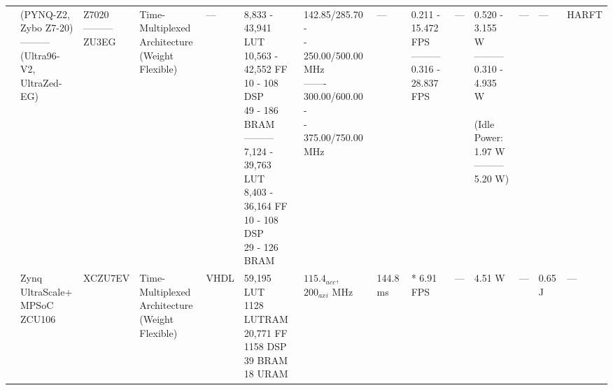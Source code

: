 \begin{center}
{\begin{tabular}{llllllllllllll}
\cite{sabogalReconfigurableFrameworkResilient2021} & \makecell[tl]{(PYNQ-Z2,\\ Zybo Z7-20)\\ ---------\\ (Ultra96-V2,\\ UltraZed-EG)} & \makecell[tl]{Z7020\\ ---------\\ ZU3EG} & \makecell[tl]{Time-Multiplexed\\ Architecture\\ (Weight Flexible)} & --- & \makecell[tl]{8,833 - 43,941 LUT\\ 10,563 - 42,552 FF\\ 10 - 108 DSP\\ 49 - 186 BRAM\\ ---------\\ 7,124 - 39,763 LUT\\ 8,403 - 36,164 FF\\ 10 - 108 DSP\\ 29 - 126 BRAM} & \makecell[tl]{142.85/285.70 -\\- 250.00/500.00\\ MHz\\ ------- \\ 300.00/600.00 -\\- 375.00/750.00\\ MHz} & --- & \makecell[tl]{0.211 - 15.472\\ FPS\\ ---------\\ 0.316 - 28.837\\ FPS} & --- & \makecell[tl]{0.520 - 3.155 W\\ ---------\\ 0.310 - 4.935 W\\ \\ (Idle Power:\\ 1.97 W\\ ---------\\ 5.20 W)} & --- & --- & \makecell[tl]{HARFT\\\cite{wilsonHybridAdaptiveReconfigurable2017}} \\
\cite{paciniMultiCacheSystemOnChip2021} & \makecell[tl]{Zynq\\ UltraScale+\\ MPSoC\\ ZCU106} & XCZU7EV & \makecell[tl]{Time-Multiplexed\\ Architecture\\ (Weight Flexible)} & VHDL & \makecell[tl]{59,195 LUT\\ 1128 LUTRAM\\ 20,771 FF\\ 1158 DSP\\ 39 BRAM\\ 18 URAM} & \makecell[tl]{$115.4_{acc}$,\\ $200_{axi}$\\ MHz} & 144.8 ms & * 6.91 FPS & --- & 4.51 W & --- & 0.65 J & --- \\ \hline

\end{tabular}}
\end{center}
